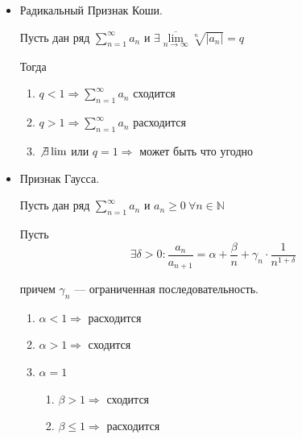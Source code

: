 \documentclass[14pt]{extarticle}
\numberwithin{equation}{section}
\newcommand{\NN}{\mathbb{N}}
\begin{document}
\begin{itemize}
            \newpage
        \item
            Радикальный Признак Коши.

            Пусть дан ряд \( \sum\limits_{n = 1}^{\infty} a_n \)
            и \( \exists \overline{\lim\limits_{n \to \infty}} \sqrt[n]{|a_n|} = q \)

            Тогда
            \begin{enumerate}
                \item
                    \( q < 1 \Rightarrow \sum\limits_{n = 1}^{\infty} a_n \) сходится
                \item
                    \( q > 1 \Rightarrow \sum\limits_{n = 1}^{\infty} a_n \) расходится
                \item
                    \( \not\exists\lim \) или \( q = 1 \Rightarrow \) может быть что угодно
            \end{enumerate}
        \item
            Признак Гаусса.

            Пусть дан ряд \( \sum\limits_{n = 1}^{\infty} a_n \) и \( a_n \geq 0 \ \forall n \in \NN \)

            Пусть
            \[
                \exists \delta > 0 : \frac{a_n}{a_{n + 1}} = \alpha + \frac{\beta}{n} + \gamma_n \cdot \frac{1}{n^{1 + \delta}}
            \]

            причем \( \gamma_n \) --- ограниченная последовательность.

            \begin{enumerate}
                \item
                    \( \alpha < 1 \Rightarrow \) расходится
                \item
                    \( \alpha > 1 \Rightarrow \) сходится
                \item
                    \( \alpha = 1 \)

                    \begin{enumerate}
                        \item
                            \( \beta > 1 \Rightarrow \) сходится
                        \item
                            \( \beta \leq 1 \Rightarrow \) расходится
                    \end{enumerate}
            \end{enumerate}
    \end{itemize}

    \newpage
\end{document}
